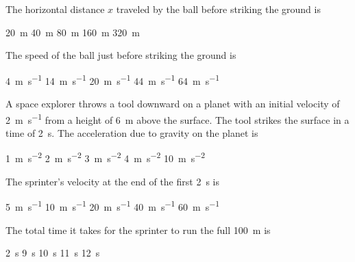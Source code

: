 \documentclass{../../../oss-ap12ibhl-print}
\begin{document}
\begin{questions}
  \question The horizontal distance $x$ traveled by the ball before striking the
  ground is
  \begin{choices}
    \choice\SI{20}{\metre}
    \choice\SI{40}{\metre}
    \choice\SI{80}{\metre} 
    \choice\SI{160}{\metre}
    \choice\SI{320}{\metre}
  \end{choices}

  \question The speed of the ball just before striking the ground is
  \begin{choices}
    \choice\SI{4}{\metre\per\second}
    \choice\SI{14}{\metre\per\second}
    \choice\SI{20}{\metre\per\second}
    \choice\SI{44}{\metre\per\second}
    \choice\SI{64}{\metre\per\second}
  \end{choices}

  \question A space explorer throws a tool downward on a planet with an initial
  velocity of \SI{2}{\metre\per\second} from a height of \SI{6}{\metre}
  above the surface. The tool strikes the surface in a time of \SI{2}{\second}.
  The acceleration due to gravity on the planet is
  \begin{choices}
    \choice\SI{1}{\metre\per\second\squared}
    \choice\SI{2}{\metre\per\second\squared}
    \choice\SI{3}{\metre\per\second\squared}
    \choice\SI{4}{\metre\per\second\squared}
    \choice\SI{10}{\metre\per\second\squared}
  \end{choices}

  
  \question The sprinter's velocity at the end of the first \SI{2}{\second} is
  \begin{choices}
    \choice\SI{5 }{\metre\per\second}
    \choice\SI{10}{\metre\per\second}
    \choice\SI{20}{\metre\per\second}
    \choice\SI{40}{\metre\per\second}
    \choice\SI{60}{\metre\per\second}
  \end{choices}
  \label{q:sprinter1}

  \question The total time it takes for the sprinter to run the full
  \SI{100}{\metre} is
  \begin{choices}
    \choice\SI{2}{\second}
    \choice\SI{9}{\second}
    \choice\SI{10}{\second}
    \choice\SI{11}{\second}
    \choice\SI{12}{\second}
  \end{choices}
  \label{q:sprinter2}
    

\end{questions}
\end{document}
